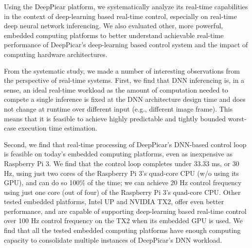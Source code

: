 Using the DeepPicar platform, we systematically analyze its real-time
capabilities in the context of deep-learning based real-time
control, especially on real-time deep neural network inferencing.
We also evaluated other, more powerful, embedded computing
platforms to better understand achievable real-time performance of
DeepPicar's deep-learning based control system and the impact of
computing hardware architectures.

%
%
%
%
%
%
From the systematic study, we made a number of interesting
observations from the perspective of real-time systems.
First, we find that DNN inferencing is, in a sense, an ideal real-time
workload as the amount of computation needed to compete a single
inference is fixed at the DNN architecture design time and does not
change at runtime over different input (e.g., different image frame).
This means that it is feasible to achieve highly predictable and
tightly bounded worst-case execution time estimation.

Second, we find that real-time processing of DeepPicar's DNN-based
control loop is feasible on today's embedded computing platforms, even 
as inexpensive as Raspberry Pi 3. We find that the control loop completes 
under 33.$\overline{\mbox{33}}$ ms, or 30 Hz, using just two cores of
the Raspberry Pi 3's quad-core CPU (w/o using its GPU), and can
do so 100\% of the time; we can achieve 20 Hz control frequency using
just one core (out of four) of the Raspberry Pi 3's quad-core CPU.
Other tested embedded platforms, Intel UP and NVIDIA TX2, offer even
better performance, and are capable of supporting deep-learning based 
real-time control over 100 Hz control frequency on the TX2 when its
embedded GPU is used.
We find that all the tested embedded computing platforms have 
enough computing capacity to consolidate multiple instances of
DeepPicar's DNN workload.


